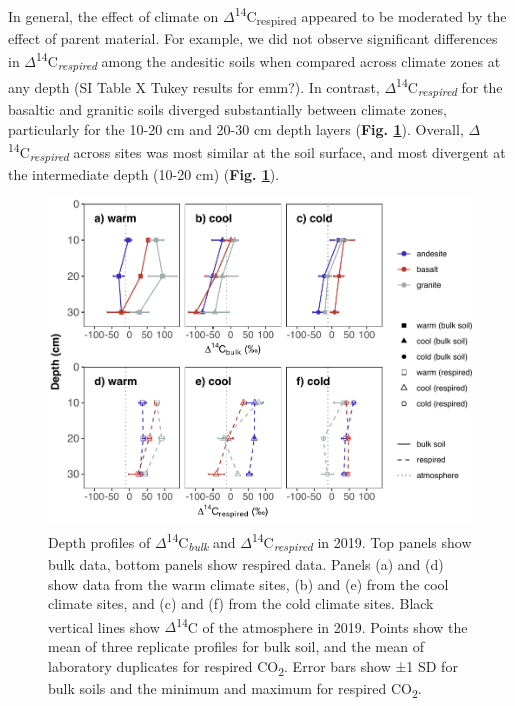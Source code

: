 \documentclass[english,man,floatsintext]{apa6}
\begin{document}
In general, the effect of climate on \(\Delta\)\textsuperscript{14}C\textsubscript{respired} appeared to be moderated by the effect of parent material. For example, we did not observe significant differences in \(\Delta\)\textsuperscript{14}C\textsubscript{\emph{respired}} among the andesitic soils when compared across climate zones at any depth (SI Table X Tukey results for emm?). In contrast, \(\Delta\)\textsuperscript{14}C\textsubscript{\emph{respired}} for the basaltic and granitic soils diverged substantially between climate zones, particularly for the 10-20 cm and 20-30 cm depth layers (\textbf{Fig. \ref{fig:blk-inc-pro-19}}). Overall, \(\Delta\)\textsuperscript{14}C\textsubscript{\emph{respired}} across sites was most similar at the soil surface, and most divergent at the intermediate depth (10-20 cm) (\textbf{Fig. \ref{fig:blk-inc-pro-19}}).



\begin{figure}

{\centering \includegraphics{sra-blk-inc-19_files/figure-latex/blk-inc-pro-19-1} 

}

\caption{Depth profiles of \(\Delta\)\textsuperscript{14}C\textsubscript{\emph{bulk}} and \(\Delta\)\textsuperscript{14}C\textsubscript{\emph{respired}} in 2019. Top panels show bulk data, bottom panels show respired data. Panels (a) and (d) show data from the warm climate sites, (b) and (e) from the cool climate sites, and (c) and (f) from the cold climate sites. Black vertical lines show \(\Delta\)\textsuperscript{14}C of the atmosphere in 2019. Points show the mean of three replicate profiles for bulk soil, and the mean of laboratory duplicates for respired CO\textsubscript{2}. Error bars show ±1 SD for bulk soils and the minimum and maximum for respired CO\textsubscript{2}.}\label{fig:blk-inc-pro-19}
\end{figure}
\end{document}
